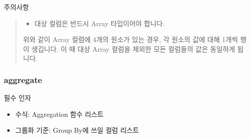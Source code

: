 \documentclass[letterpaper,10pt,english]{sphinxmanual}
\begin{document}
주의사항
\begin{quote}
\begin{itemize}
\item {} 
대상 컬럼은 반드시 Array 타입이어야 합니다.
\begin{quote}

\begin{figure}[H]
\centering

\noindent{}
\end{figure}
\end{quote}

\end{itemize}

위와 같이 Array 컬럼에 4개의 원소가 있는 경우, 각 원소의 값에 대해 1개씩 행이 생깁니다. 이 때 대상 Array 컬럼을 제외한 모든 컬럼들의 값은 동일하게 됩니다.
\begin{quote}

\begin{figure}[H]
\centering

\noindent{}
\end{figure}
\end{quote}
\end{quote}


\subsubsection{aggregate}
\label{\detokenize{discovery/part07/rule_kinds:aggregate}}
\begin{figure}[H]
\centering

\noindent{}
\end{figure}

필수 인자
\begin{itemize}
\item {} 
수식: Aggregation 함수 리스트

\item {} 
그룹화 기준: Group By에 쓰일 컬럼 리스트

\end{itemize}
\end{document}
